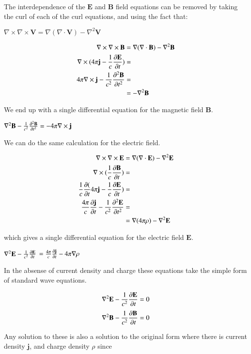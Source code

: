 \documentclass{article}      %
\newcommand{\grad}[1]{\nabla#1}
\newcommand{\curl}[1]{\nabla \times #1}
\newcommand{\Curl}[1]{\nabla \times \mathbf{#1}}
\newcommand{\Diverg}[1]{\nabla \cdot \mathbf{#1}}
\newcommand{\curlCurl}[1]{\curl\Curl{#1}}
\newcommand{\delsquared}[1]{\nabla^2{#1}}
\newcommand{\Delsquared}[1]{{\nabla^2}{\mathbf{#1}}}
\newcommand{\ddt}[1]{ {{\partial{#1}} \over {\partial{t}}}}
\newcommand{\Ddt}[1]{ {{\partial{\mathbf{#1}}} \over {\partial{t}}}}
\newcommand{\Ddts}[1]{ {{\partial^2{\mathbf{#1}}} \over {\partial{t}^2}}}
\newcommand{\Bj}[0]{\mathbf{j}}
\newcommand{\BB}[0]{\mathbf{B}}
\newcommand{\BE}[0]{\mathbf{E}}
\begin{document}
The interdependence of the $\BE$ and $\BB$ field equations can be removed by taking the
curl of each of the curl equations, and using the fact that:

$\curlCurl{V} = \grad (\Diverg V) - \Delsquared{V}$

\begin{align*}
\curlCurl{B} &= \grad (\Diverg{B}) - \Delsquared{B} \\
\curl(4\pi\Bj - {1 \over c} \Ddt{E}) &= \\
4\pi \Curl{j} - {1 \over c^2} \Ddts{B} &= \\
      	     &= 		   - \Delsquared{B}
\end{align*}

We end up with a single differential equation for the magnetic field $\BB$.

$\delsquared{\BB} - {1 \over c^2} \Ddts{B} = - 4\pi \Curl{j}$

We can do the same calculation for the electric field.

\begin{align*}
\curlCurl{E} &= \grad (\Diverg{E}) - \Delsquared{E} \\
\curl({1 \over c} \Ddt{B}) &= \\
{1 \over c} \ddt(4\pi \Bj - {1 \over c} \Ddt{E}) &= \\
{4\pi \over c} \Ddt{j} - {1 \over c^2} \Ddts{E} &= \\
             &= \grad (4\pi\rho) - \Delsquared{E} \\
\end{align*}

which gives a single differential equation for the electric field $\BE$.

$\Delsquared{E} - {1 \over c^2} \Ddt{E}$
$ = {4\pi \over c} \Ddt{j} - 4\pi \grad{\rho}$

In the absense of current density and charge these equations take the simple form of standard wave
equations.

\begin{equation*}
\Delsquared{E} - {1 \over c^2} \Ddt{E} = 0
\end{equation*}
\begin{equation*}
\Delsquared{B} - {1 \over c^2} \Ddt{B} = 0
\end{equation*}

Any solution to these is also a solution to the original form where there is current density $\Bj$, and 
charge density $\rho$ since 
\end{document}
